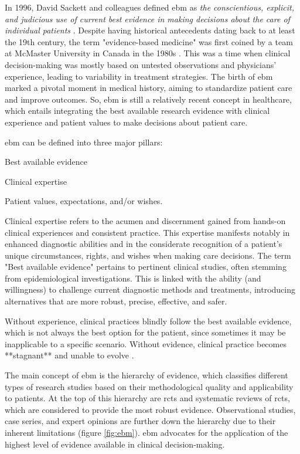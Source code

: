 
In 1996, David Sackett and colleagues defined \ac{ebm} as \textit{the conscientious, explicit, and judicious use of current best evidence in making decisions about the care of individual patients} \cite{sackettEvidenceBasedMedicine1996}. Despite having historical antecedents dating back to at least the 19th century, the term "evidence-based medicine" was first coined by a team at McMaster University in Canada in the 1980s \cite{thomaBriefHistoryEvidenceBased2015}. This was a time when clinical decision-making was mostly based on untested observations and physicians' experience, leading to variability in treatment strategies. The birth of \ac{ebm} marked a pivotal moment in medical history, aiming to standardize patient care and improve outcomes. So, \ac{ebm} is still a relatively recent concept in healthcare, which entails integrating the best available research evidence with clinical experience and patient values to make decisions about patient care.

\Ac{ebm} can be defined into three major pillars:

\begin{myitemize}
    \item Best available evidence
    \item Clinical expertise
    \item Patient values, expectations, and/or wishes.
\end{myitemize}

Clinical expertise refers to the acumen and discernment gained from hands-on clinical experiences and consistent practice. This expertise manifests notably in enhanced diagnostic abilities and in the considerate recognition of a patient's unique circumstances, rights, and wishes when making care decisions. The term "Best available evidence" pertains to pertinent clinical studies, often stemming from epidemiological investigations. This is linked with the ability (and willingness) to challenge current diagnostic methods and treatments, introducing alternatives that are more robust, precise, effective, and safer. 

Without experience, clinical practices blindly follow the best available evidence, which is not always the best option for the patient, since sometimes it may be inapplicable to a specific scenario. Without evidence, clinical practice becomes **stagnant** and unable to evolve \cite{sackettEvidenceBasedMedicine1996}.

The main concept of \ac{ebm} is the hierarchy of evidence, which classifies different types of research studies based on their methodological quality and applicability to patients. At the top of this hierarchy are \acp{rct} and systematic reviews of \acp{rct}, which are considered to provide the most robust evidence. Observational studies, case series, and expert opinions are further down the hierarchy due to their inherent limitations (figure \ref{fig:ebm}). \ac{ebm} advocates for the application of the highest level of evidence available in clinical decision-making.

